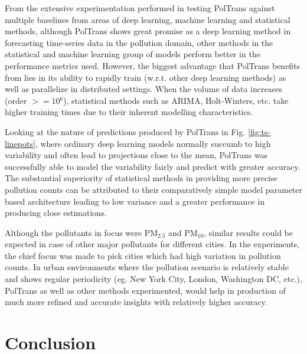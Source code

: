 \documentclass[twocolumn]{svjour3}          %
\begin{document}
From the extensive experimentation performed in testing {PolTrans} against multiple baselines from areas of deep learning, machine learning and statistical methods, although {PolTrans} shows great promise as a deep learning method in forecasting time-series data in the pollution domain, other methods in the statistical and machine learning group of models perform better in the performance metrics used. However, the biggest advantage that {PolTrans} benefits from lies in its ability to rapidly train (w.r.t. other deep learning methods) as well as parallelize in distributed settings. When the volume of data increases (order ${>= 10{^{6}}}$), statistical methods such as ARIMA, Holt-Winters, etc. take higher training times due to their inherent modelling characteristics.

Looking at the nature of predictions produced by {PolTrans} in Fig. \ref{fig:ts-linepots}, where ordinary deep learning models normally succumb to high variability and often lead to projections close to the mean, {PolTrans} was successfully able to model the variability fairly and predict with greater accuracy. The substantial superiority of statistical methods in providing more precise pollution counts can be attributed to their comparatively simple model parameter based architecture leading to low variance and a greater performance in producing close estimations.

Although the pollutants in focus were PM${_{2.5}}$ and PM${_{10}}$, similar results could be expected in case of other major pollutants for different cities. In the experiments, the chief focus was made to pick cities which had high variation in pollution counts. In urban environments where the pollution scenario is relatively stable and shows regular periodicity (eg. New York City, London, Washington DC, etc.), {PolTrans} as well as other methods experimented, would help in production of much more refined and accurate insights with relatively higher accuracy.


\section{Conclusion}
\label{sec:conclusion}
\end{document}

